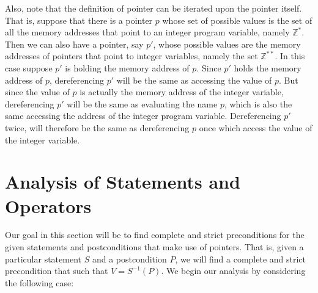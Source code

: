 \documentclass[11pt]{article}
\newcounter{definition}
\newcounter{lemma}
\newcounter{theorem}
\newcounter{example}
\newcounter{case}
\begin{document}
Also, note that the definition of pointer can be iterated upon the pointer itself. That is, suppose that there is a pointer $p$ whose set of possible values is the set of all the memory addresses that point to an integer program variable, namely $\mathbb{Z}^{*}$. Then we can also have a pointer, say $p'$, whose possible values are the memory addresses of pointers that point to integer variables, namely the set $\mathbb{Z}^{**}$. In this case suppose $p'$ is holding the memory address of $p$. Since $p'$ holds the memory address of $p$, dereferencing $p'$ will be the same as accessing the value of $p$. But since the value of $p$ is actually the memory address of the integer variable, dereferencing $p'$ will be the same as evaluating the name $p$, which is also the same accessing the address of the integer program variable. Dereferencing $p'$ twice, will therefore be the same as dereferencing $p$ once which access the value of the integer variable.


\section{Analysis of Statements and Operators}
\setcounter{definition}{0}
\setcounter{lemma}{0}
\setcounter{theorem}{0}
\setcounter{example}{0}


Our goal in this section will be to find complete and strict preconditions for the given statements and postconditions that make use of pointers. That is, given a particular statement $S$ and a postcondition $P$, we will find a complete and strict precondition that such that $V=S^{-1}(P)$. We begin our analysis by considering the following case:
\end{document}
